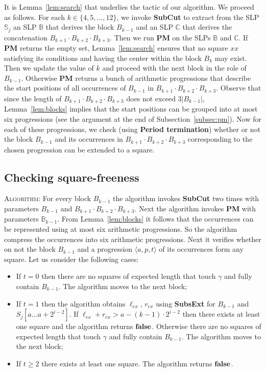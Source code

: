 \documentclass[11pt]{article}
\theoremstyle{break}
\newcommand{\prog}[3]{\langle #1, #2, #3\rangle}
\newcommand{\slp}[1]{\mathbb{#1}}
\begin{document}
It is Lemma~\ref{lem:search} that underlies the tactic of our algorithm. We proceed as follows. For each $k\in\{4,5,\dots,12\}$, we invoke
\textbf{SubCut} to extract from the SLP $\slp{S}_j$ an SLP $\slp{B}$ that derives the block $B_{k-1}$ and an SLP $\slp{C}$ that derives the
concatenation $B_{k+1}\cdot B_{k+2}\cdot B_{k+3}$. Then we run \textbf{PM} on the SLPs $\slp{B}$ and $\slp{C}$. If \textbf{PM} returns the
empty set, Lemma~\ref{lem:search} ensures that no square $xx$ satisfying its conditions and having the center within the block $B_k$ may
exist. Then we update the value of $k$ and proceed with the next block in the role of $B_{k-1}$. Otherwise \textbf{PM} returns a bunch of
arithmetic progressions that describe the start positions of all occurrences of $B_{k-1}$ in $B_{k+1}\cdot B_{k+2}\cdot B_{k+3}$. Observe
that since the length of $B_{k+1}\cdot B_{k+2}\cdot B_{k+3}$ does not exceed $3|B_{k-1}|$, Lemma~\ref{lem:blocks} implies that the start
positions can be grouped into at most six progressions (see the argument at the end of Subsection~\ref{subsec:pm}). Now for each of these
progressions, we check (using \textbf{Period termination}) whether or not the block $B_{k-1}$ and its occurrences in $B_{k+1}\cdot
B_{k+2}\cdot B_{k+3}$ corresponding to the chosen progression can be extended to a square.

\subsection{Checking square-freeness}

\noindent \textsc{Algorithm:} For every block $B_{k-1}$ the algorithm invokes \textbf{SubCut} two times with parameters
$B_{k-1}$ and $B_{k+1}\cdot B_{k+2} \cdot B_{k+3}$. Next the algorithm invokes \textbf{PM} with parameters $\slp{B}_{k-1}$. From
Lemma~\ref{lem:blocks} it follows that the occurrences can be represented using at most six arithmetic
progressions. So the algorithm compress the occurrences into six arithmetic progressions. Next it verifies whether on
not the block $B_{k-1}$ and a progression $\prog{a}{p}{t}$ of its occurrences form any square. Let us consider the
following cases:

\begin{itemize}
\item If $t = 0$ then there are no squares of expected length that touch $\gamma$ and fully contain $B_{k-1}$. The
algorithm moves to the next block;

\item If $t = 1$ then the algorithm obtains $\ell_{ex}$, $r_{ex}$ using \textbf{SubsExt} for $B_{k-1}$ and $S_j[a\dots
a + 2^{i-2}]$. If $\ell_{ex} + r_{ex} > a - (k-1)\cdot 2^{i-2}$ then there exists at least one square and the algorithm
returns $\bf{false}$. Otherwise there are no squares of expected length that touch $\gamma$ and fully contain
$B_{k-1}$. The algorithm moves to the next block;

\item If $t \geq 2$ there exists at least one square. The algorithm returns $\bf{false}$.
\end{itemize}
\end{document}
